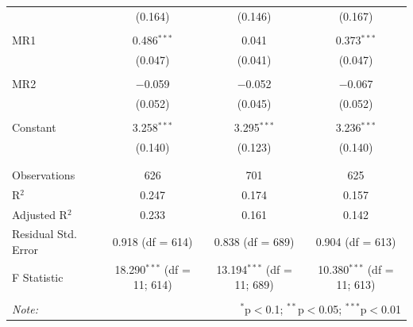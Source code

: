 \documentclass[
]{article}
\begin{document}
\begin{table}[!htbp]
\begin{tabular}{@{\extracolsep{5pt}}lccc}
  & (0.164) & (0.146) & (0.167) \\ 
  & & & \\ 
 MR1 & 0.486$^{***}$ & 0.041 & 0.373$^{***}$ \\ 
  & (0.047) & (0.041) & (0.047) \\ 
  & & & \\ 
 MR2 & $-$0.059 & $-$0.052 & $-$0.067 \\ 
  & (0.052) & (0.045) & (0.052) \\ 
  & & & \\ 
 Constant & 3.258$^{***}$ & 3.295$^{***}$ & 3.236$^{***}$ \\ 
  & (0.140) & (0.123) & (0.140) \\ 
  & & & \\ 
\hline \\[-1.8ex] 
Observations & 626 & 701 & 625 \\ 
R$^{2}$ & 0.247 & 0.174 & 0.157 \\ 
Adjusted R$^{2}$ & 0.233 & 0.161 & 0.142 \\ 
Residual Std. Error & 0.918 (df = 614) & 0.838 (df = 689) & 0.904 (df = 613) \\ 
F Statistic & 18.290$^{***}$ (df = 11; 614) & 13.194$^{***}$ (df = 11; 689) & 10.380$^{***}$ (df = 11; 613) \\ 
\hline 
\hline \\[-1.8ex] 
\textit{Note:}  & \multicolumn{3}{r}{$^{*}$p$<$0.1; $^{**}$p$<$0.05; $^{***}$p$<$0.01} \\ 
\end{tabular} 
\end{table} 
\endgroup
\end{document}
